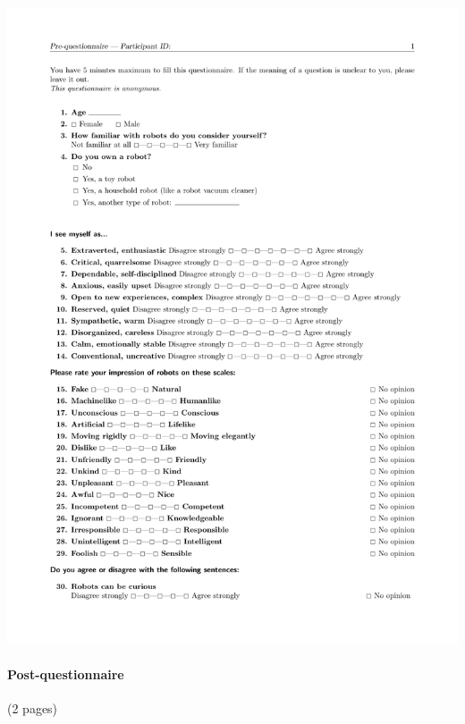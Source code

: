 \documentclass[lettersize, noapacite, twoside, HRI]{apa_HRI}
\begin{document}
\begin{center}
    \includegraphics[width=0.9\linewidth, page=2]{pre-questionnaire}
\end{center}

\pagebreak
\paragraph{Post-questionnaire} (2 pages)
\end{document}
